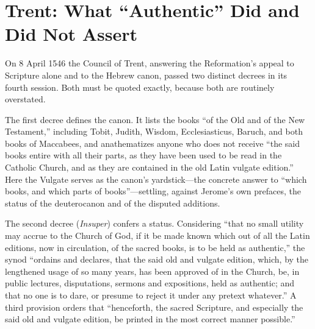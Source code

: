 \section{Trent: What ``Authentic'' Did and Did Not Assert}

On 8 April 1546 the Council of Trent, answering the Reformation's appeal
to Scripture alone and to the Hebrew canon, passed two distinct decrees in
its fourth session. Both must be quoted exactly, because both are
routinely overstated.

The first decree defines the canon. It lists the books ``of the Old and of
the New Testament,'' including Tobit, Judith, Wisdom, Ecclesiasticus,
Baruch, and both books of Maccabees, and anathematizes anyone who does not
receive ``the said books entire with all their parts, as they have been
used to be read in the Catholic Church, and as they are contained in the
old Latin vulgate edition.'' Here the Vulgate serves as the canon's
yardstick---the concrete answer to ``which books, and which parts of
books''---settling, against Jerome's own prefaces, the status of the
deuterocanon and of the disputed additions.

The second decree (\textit{Insuper}) confers a status. Considering ``that
no small utility may accrue to the Church of God, if it be made known
which out of all the Latin editions, now in circulation, of the sacred
books, is to be held as authentic,'' the synod ``ordains and declares,
that the said old and vulgate edition, which, by the lengthened usage of
so many years, has been approved of in the Church, be, in public
lectures, disputations, sermons and expositions, held as authentic; and
that no one is to dare, or presume to reject it under any pretext
whatever.'' A third provision orders that ``henceforth, the sacred
Scripture, and especially the said old and vulgate edition, be printed in
the most correct manner possible.''

